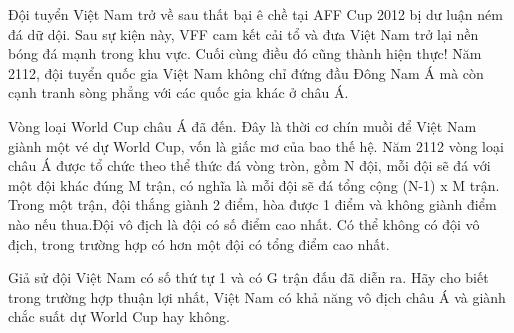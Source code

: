\textbf{}   Đội tuyển Việt Nam trở về sau thất bại ê chề tại AFF Cup 2012 bị dư luận ném đá dữ dội. Sau sự kiện này, VFF cam kết cải tổ và đưa Việt Nam trở lại nền bóng đá mạnh trong khu vực. Cuối cùng điều đó cũng thành hiện thực! Năm 2112, đội tuyển quốc gia Việt Nam không chỉ đứng đầu Đông Nam Á mà còn cạnh tranh sòng phẳng với các quốc gia khác ở châu Á.  

   Vòng loại World Cup châu Á đã đến. Đây là thời cơ chín muồi để Việt Nam giành một vé dự World Cup, vốn là giấc mơ của bao thế hệ. Năm 2112 vòng loại châu Á được tổ chức theo thể thức đá vòng tròn, gồm N đội, mỗi đội sẽ đá với một đội khác đúng M trận, có nghĩa là mỗi đội sẽ đá tổng cộng (N-1) x M trận. Trong một trận, đội thắng giành 2 điểm, hòa được 1 điểm và không giành điểm nào nếu thua.Đội vô địch là đội có số điểm cao nhất. Có thể không có đội vô địch, trong trường hợp có hơn một đội có tổng điểm cao nhất.  

   Giả sử đội Việt Nam có số thứ tự 1 và có G trận đấu đã diễn ra. Hãy cho biết trong trường hợp thuận lợi nhất, Việt Nam có khả năng vô địch châu Á và giành chắc suất dự World Cup hay không.  

\